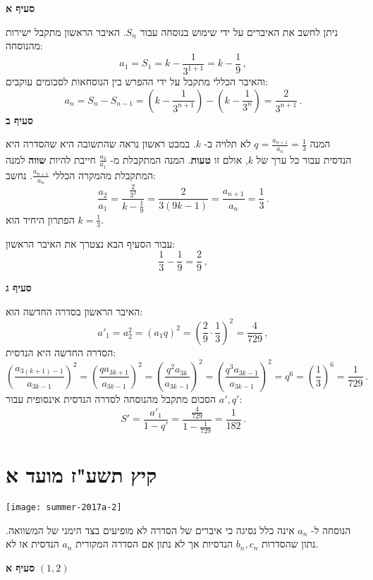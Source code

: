 \textbf{סעיף א}

ניתן לחשב את האיברים על ידי שימוש בנוסחה עבור
$S_n$.
האיבר הראשון מתקבל ישירות מהנוסחה:
\[
a_1=S_1=k-\frac{1}{3^{1+1}}=k-\frac{1}{9}\,,
\]
והאיבר הכללי מתקבל על ידי ההפרש בין הנוסחאות לסכומים עוקבים:
\[
a_n=S_{n}-S_{n-1}=\left(k-\frac{1}{3^{n+1}}\right)-\left(k-\frac{1}{3^{n}}\right)=\frac{2}{3^{n+1}}\,.
\]
\textbf{סעיף ב}

המנה
$q=\displaystyle\frac{a_{n+1}}{a_{n}}=\frac{1}{3}$
לא תלויה ב-%
$k$.
במבט ראשון נראה שהתשובה היא שהסדרה היא הנדסית עבור כל ערך של
$k$,
אולם זו
\textbf{טעות}.
המנה המתקבלת מ-%
$\displaystyle\frac{a_2}{a_1}$
חייבת להיות
\textbf{שווה}
למנה המתקבלת מהמקרה הכללי
$\displaystyle\frac{a_{n+1}}{a_{n}}$.
נחשב:
\[
\frac{a_2}{a_1}=\frac{\displaystyle\frac{2}{3^3}}{\displaystyle k-\frac{1}{9}} =  \frac{2}{3(9k-1)} =\frac{a_{n+1}}{a_n}=\frac{1}{3}\,.
\]
הפתרון היחיד הוא
$\displaystyle k=\frac{1}{3}$.

עבור הסעיף הבא נצטרך את האיבר הראשון:
\[
\displaystyle \frac{1}{3}-\frac{1}{9}=\frac{2}{9}\,,
\]

\np

\textbf{סעיף ג}

האיבר הראשון בסדרה החדשה הוא:
\[
a'_1 = a_2^2=\left(a_1q\right)^2=\left(\frac{2}{9}\cdot\frac{1}{3}\right)^2=\frac{4}{729}\,,
\]
הסדרה החדשה היא הנדסית:
\[
\left(\frac{a_{3(k+1)-1}}{a_{3k-1}}\right)^2 =  \left(\frac{qa_{3k+1}}{a_{3k-1}}\right)^2=\left(\frac{q^2a_{3k}}{a_{3k-1}}\right)^2=\left(\frac{q^3a_{3k-1}}{a_{3k-1}}\right)^2=q^6=\left(\frac{1}{3}\right)^6=\frac{1}{729}\,.
\]
הסכום מתקבל מהנוסחה לסדרה הנדסית אינסופית עבור
$a', q'$:
\[
S'=\frac{a'_1}{1-q'}=
\frac{\displaystyle\frac{4}{729}}{1-\displaystyle\frac{1}{729}}= \frac{1}{182}\,.
\]

\np
\section{קיץ תשע"ז מועד א}

\begin{center}
\texttt{[image: summer-2017a-2]}
\end{center}
הנוסחה ל-%
$a_n$
אינה כלל נסיגה כי איברים של הסדרה לא מופיעים בצד הימני של המשוואה. נתון שהסדרות 
$b_n,c_n$
הנדסיות אך לא נתון אם הסדרה המקורית
$a_n$
הנדסית או לא.

\textbf{סעיף א}
$(1,2)$

